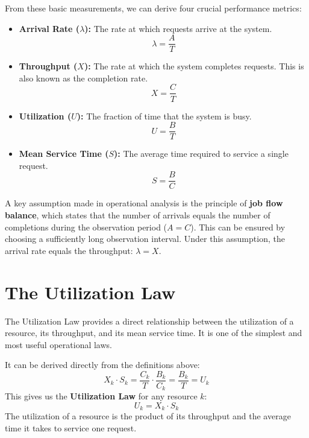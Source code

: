 From these basic measurements, we can derive four crucial performance metrics:
\begin{itemize}
    \item \textbf{Arrival Rate ($\lambda$):} The rate at which requests arrive at the system.
    \begin{equation}
        \lambda = \frac{A}{T}
    \end{equation}
    \item \textbf{Throughput ($X$):} The rate at which the system completes requests. This is also known as the completion rate.
    \begin{equation}
        X = \frac{C}{T}
    \end{equation}
    \item \textbf{Utilization ($U$):} The fraction of time that the system is busy.
    \begin{equation}
        U = \frac{B}{T}
    \end{equation}
    \item \textbf{Mean Service Time ($S$):} The average time required to service a single request.
    \begin{equation}
        S = \frac{B}{C}
    \end{equation}
\end{itemize}

A key assumption made in operational analysis is the principle of \textbf{job flow balance}, which states that the number of arrivals equals the number of completions during the observation period ($A = C$). This can be ensured by choosing a sufficiently long observation interval. Under this assumption, the arrival rate equals the throughput: $\lambda = X$.

\section{The Utilization Law}
The Utilization Law provides a direct relationship between the utilization of a resource, its throughput, and its mean service time. It is one of the simplest and most useful operational laws.

It can be derived directly from the definitions above:
\begin{equation}
    X_k \cdot S_k = \frac{C_k}{T} \cdot \frac{B_k}{C_k} = \frac{B_k}{T} = U_k
\end{equation}
This gives us the \textbf{Utilization Law} for any resource $k$:
\begin{equation}
    U_k = X_k \cdot S_k
\end{equation}
The utilization of a resource is the product of its throughput and the average time it takes to service one request.

